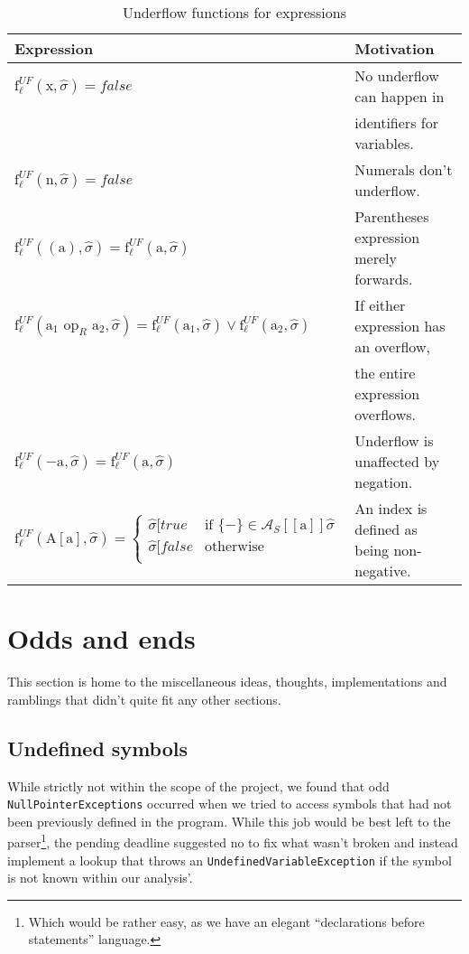\begin{table}[h]
\begin{tabular}{| l | l |}
  \hline
  Expression & Motivation\\
  \hline
  \hline
  $\text{f}_\ell^{UF} (\text{x},\widehat{\sigma}) = false $ & No underflow can happen in \\ 
                                                            & identifiers for variables.\\
  \hline
  $\text{f}_\ell^{UF} (\text{n},\widehat{\sigma}) = false $ & Numerals don't underflow.\\
  \hline
  $\text{f}_\ell^{UF} ((\text{a}),\widehat{\sigma}) = \text{f}_\ell^{UF} (\text{a},\widehat{\sigma}) $ & Parentheses expression merely forwards.\\
  \hline
  $\text{f}_\ell^{UF} (\text{a}_1 \text{ op}_R \text{ a}_2,\widehat{\sigma}) = \text{f}_\ell^{UF} (\text{a}_1,\widehat{\sigma}) \vee \text{f}_\ell^{UF} (\text{a}_2,\widehat{\sigma}) $ & If either expression has an overflow,\\
                                & the entire expression overflows.\\
  \hline
  $\text{f}_\ell^{UF} (-\text{a},\widehat{\sigma}) = \text{f}_\ell^{UF} (\text{a},\widehat{\sigma}) $ & Underflow is unaffected by negation.\\
  \hline
  $\text{f}_\ell^{UF} (\text{A}[\text{a}],\widehat{\sigma}) = 
     \begin{cases} 
        \widehat{\sigma}[true   & \text{if } \{-\} \in \mathcal{A}_S [\![\text{a}]\!]\widehat{\sigma}\\
        \widehat{\sigma}[false  & \text{otherwise} \\
     \end{cases}
   $ & An index is defined as being non-negative.\\
  \hline
\end{tabular}
\centering
\caption{Underflow functions for expressions}
\label{table:underflow_functions_expressions}
\end{table}


\section{Odds and ends}
This section is home to the miscellaneous ideas, thoughts, implementations and ramblings that didn't quite fit any other sections.

\subsection{Undefined symbols}
While strictly not within the scope of the project, we found that odd \texttt{NullPointerExceptions} occurred when we tried to access symbols that had not been previously defined in the program. While this job would be best left to the parser\footnote{Which would be rather easy, as we have an elegant ``declarations before statements'' language.}, the pending deadline suggested no to fix what wasn't broken and instead implement a lookup that throws an \texttt{UndefinedVariableException} if the symbol is not known within our analysis'.



